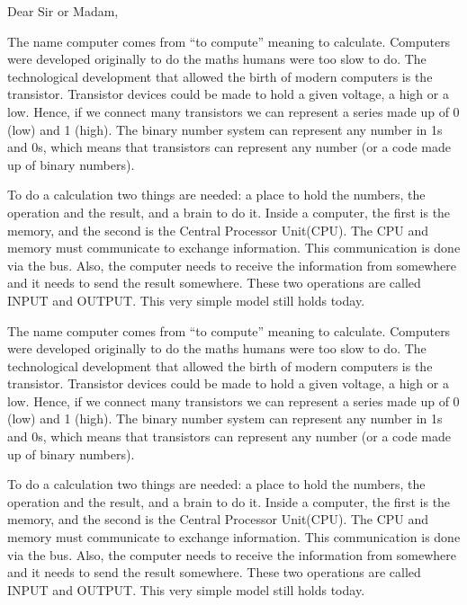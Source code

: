 \documentclass[blank]{impletter}
\author{Letty Foulkes}
\begin{document}
{
Dear Sir or Madam,
}
\informal

The name computer comes from ``to compute'' meaning to
calculate. Computers were developed originally to do the maths humans
were too slow to do. The technological development that allowed the
birth of modern computers is the transistor. Transistor devices could
be made to hold a given voltage, a high or a low. Hence, if we connect
many transistors we can represent a series made up of 0 (low) and 1
(high). The binary number system can represent any number in 1s and
0s, which means that transistors can represent any number (or a code
made up of binary numbers).

To do a calculation two things are needed: a place to hold the
numbers, the operation and the result, and a brain to do it. Inside a
computer, the first is the memory, and the second is the Central
Processor Unit(CPU). The CPU and memory must communicate to exchange
information. This communication is done via the bus. Also, the
computer needs to receive the information from somewhere and it needs
to send the result somewhere. These two operations are called INPUT
and OUTPUT. This very simple model still holds today.

The name computer comes from ``to compute'' meaning to
calculate. Computers were developed originally to do the maths humans
were too slow to do. The technological development that allowed the
birth of modern computers is the transistor. Transistor devices could
be made to hold a given voltage, a high or a low. Hence, if we connect
many transistors we can represent a series made up of 0 (low) and 1
(high). The binary number system can represent any number in 1s and
0s, which means that transistors can represent any number (or a code
made up of binary numbers).

To do a calculation two things are needed: a place to hold the
numbers, the operation and the result, and a brain to do it. Inside a
computer, the first is the memory, and the second is the Central
Processor Unit(CPU). The CPU and memory must communicate to exchange
information. This communication is done via the bus. Also, the
computer needs to receive the information from somewhere and it needs
to send the result somewhere. These two operations are called INPUT
and OUTPUT. This very simple model still holds today.
\end{document}
